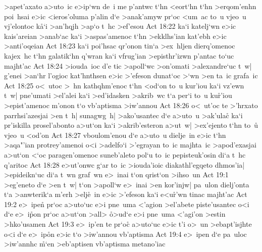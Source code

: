 >apet'axato
a>uto~ic
e>ip`wn
de~i
me
p'antwc
t`hn
<eort`hn
t`hn
>erqom'enhn
poi~hsai
e>ic
<ieros'oluma
p'alin
d`e
>anak'amyw
pr`oc
<um~ac
to~u
vjeo~u
vj'elontoc
k\r{a}`i
>an'hqjh
>ap`o
t~hc
>ef'esou\bibvsend
\vs Act 18:22
ka`i
katelj`wn
e>ic
kais'areian
>anab`ac
ka`i
>aspas'amenoc
t`hn
>ekklhs'ian
kat'ebh
e>ic
>anti'oqeian\bibvsend
\vs Act 18:23
ka`i
poi'hsac
qr'onon
tin`a
>ex~hljen
dierq'omenoc
kajex~hc
t`hn
galatik`hn
q'wran
ka`i
vfrug'ian
>episthr'izwn
p'antac
to`uc
majht'ac\bibvsend
\vs Act 18:24
>iouda~ioc
d'e
tic
>apoll`wc
>on'omati
>alexandre`uc
t~w|
g'enei
>an`hr
l'ogioc
kat'hnthsen
e>ic
>'efeson
dunat`oc
>`wn
>en
ta~ic
grafa~ic\bibvsend
\vs Act 18:25
o<~utoc
>~hn
kathqhm'enoc
t`hn
<od`on
to~u
kur'iou
ka`i
vz'ewn
t~w|
pne'umati
>el'alei
ka`i
>ed'idasken
>akrib~wc
t`a
per`i
to~u
ku\r{r}'iou
>epist'amenoc
m'onon
t`o
vb'aptisma
>iw'annou\bibvsend
\vs Act 18:26
o<~ut'oc
te
>'hrxato
parrhsi'azesjai
>en
t~h|
sunagwg~h|
>ako'usantec
d`e
a>uto~u
>ak'ulac\r{}
ka`i
pr'iskilla
prosel'abonto
a>ut`on
ka`i
>akrib'esteron
a>ut~w|
>ex'ejento
t`hn
to~u\r{}
vjeo~u
<od'on\bibvsend
\vs Act 18:27
vboulom'enou
d`e
a>uto~u
dielje~in
e>ic
t`hn
>aqa"'ian
protrey'amenoi
o<i
>adelfo`i
>'egrayan
to~ic
majhta~ic
>apod'exasjai
a>ut`on
<`oc
paragen'omenoc
suneb'aleto
pol`u
to~ic
pepisteuk'osin
di`a
t~hc
q'aritoc\bibvsend
\vs Act 18:28
e>ut'onwc
g`ar
to~ic
>iouda'ioic
diakathl'egqeto
dhmos'ia|
>epideikn`uc
di`a
t~wn
graf~wn
e>~inai
t`on
qrist`on
>ihso~un\bibvsend
\vs Act 19:1
>eg'eneto
d`e
>en
t~w|
t`on
>apoll`w
e>~inai
>en
kor'injw|
pa~ulon
dielj'onta
t`a
>anwterik`a
m'erh
>elj\r{e}~in
e>ic
>'efeson
ka`i
e<u\r{r}'wn
tinac
majht'ac\bibvsend
\vs Act 19:2
e>~ipe\r{n}
pr`oc
a>uto`uc
e>i
pne~uma
<'agion
>el'abete
piste'usantec
o<i
d`e
e>~i\r{p}on
pr`oc
a>ut`on
>all>
\r{o}>ud`e
e>i
pne~uma
<'agi'on
>estin
>hko'usamen\bibvsend
\vs Act 19:3
e>~ip'en
te
pr`oc\r{}
a>uto`uc
e>ic
t'i
o>~un
>ebapt'isjhte
o<i
d`e
e>~ip\r{o}n
e>ic
t`o
>iw'annou
vb'aptisma\bibvsend
\vs Act 19:4
e>~ipen
d`e
pa~uloc
>iw'annhc
\r{m}`en
>eb'aptisen
vb'aptisma
metano'iac
